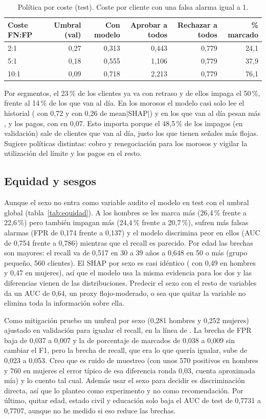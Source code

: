 \documentclass[10pt,a4paper]{article}
\newcommand{\var}[1]{\texttt{\detokenize{#1}}}
\begin{document}
\begin{table}[htbp]
\centering\small
\caption{Política por coste (test). Coste por cliente con una falsa alarma igual a 1.}\label{tab:coste}
\begin{tabular}{lrrrrr}
\toprule
Coste FN:FP & Umbral (val) & Con modelo & Aprobar a todos & Rechazar a todos & \% marcado \\
\midrule
2:1 & 0,27 & 0,313 & 0,443 & 0,779 & 24,1 \\
5:1 & 0,18 & 0,555 & 1,106 & 0,779 & 37,9 \\
10:1 & 0,09 & 0,718 & 2,213 & 0,779 & 76,1 \\
\bottomrule
\end{tabular}
\end{table}

Por segmentos, el 23\,\% de los clientes ya va con retraso y de ellos impaga el 50\,\%, frente al 14\,\% de los que van al día. En los morosos el modelo casi solo lee el historial (\var{PAY_0} con 0,72 y \var{PAY_2} con 0,26 de mean$|$SHAP$|$) y en los que van al día pesan más \var{LIMIT_BAL}, \var{BILL_AMT1} y los pagos, con \var{PAY_2} en 0,07. Esto importa porque el 48,5\,\% de los impagos (en validación) sale de clientes que van al día, justo los que tienen señales más flojas. Sugiere políticas distintas: cobro y renegociación para los morosos y vigilar la utilización del límite y los pagos en el resto.

\subsection{Equidad y sesgos}\label{sec:equidad}
Aunque el sexo no entra como variable audito el modelo en test con el umbral global (tabla~\ref{tab:equidad}). A los hombres se les marca más (26,4\,\% frente a 22,6\,\%) pero también impagan más (24,4\,\% frente a 20,7\,\%), sufren más falsas alarmas (FPR de 0,174 frente a 0,137) y el modelo discrimina peor en ellos (AUC de 0,754 frente a 0,786) mientras que el recall es parecido. Por edad las brechas son mayores: el recall va de 0,517 en 30 a 39 años a 0,648 en 50 o más (grupo pequeño, 560 clientes). El SHAP por sexo es casi idéntico (\var{PAY_0} con 0,49 en hombres y 0,47 en mujeres), así que el modelo usa la misma evidencia para los dos y las diferencias vienen de las distribuciones. Predecir el sexo con el resto de variables da un AUC de 0,64, un proxy flojo-moderado, o sea que quitar la variable no elimina toda la información sobre ella.

Como mitigación pruebo un umbral por sexo (0,281 hombres y 0,252 mujeres) ajustado en validación para igualar el recall, en la línea de \citet{hardt2016}. La brecha de FPR baja de 0,037 a 0,007 y la de porcentaje de marcados de 0,038 a 0,009 sin cambiar el F1, pero la brecha de recall, que era lo que quería igualar, sube de 0,023 a 0,053. Creo que es ruido de muestreo (con unos 570 positivos en hombres y 760 en mujeres el error típico de esa diferencia ronda 0,03, cuenta aproximada mía) y lo cuento tal cual. Además usar el sexo para decidir es discriminación directa, así que lo planteo como experimento y no como recomendación. Por último, quitar edad, estado civil y educación solo baja el AUC de test de 0,7731 a 0,7707, aunque no he medido si eso reduce las brechas.
\end{document}
